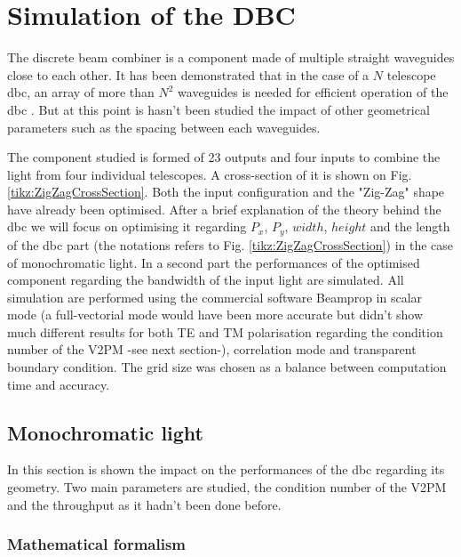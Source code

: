 \documentclass[a4paper,twoside,11pt]{article}
\begin{document}
\section{Simulation of the DBC}
    
    The discrete beam combiner is a component made of multiple straight waveguides close to each other. It has been demonstrated that in the case of a $N$ telescope \gls{dbc}, an array of more than $N^2$ waveguides is needed for efficient operation of the \gls{dbc} \cite{minardi1}. But at this point is hasn't been studied the impact of other geometrical parameters such as the spacing between each waveguides. 
    
    The component studied is formed of 23 outputs and four inputs to combine the light from four individual telescopes. A cross-section of it is shown on Fig. \ref{tikz:ZigZagCrossSection}. Both the input configuration and the "Zig-Zag" shape have already been optimised. After a brief explanation of the theory behind the \gls{dbc} we will focus on optimising it regarding $P_x$, $P_y$, $width$, $height$ and the length of the \gls{dbc} part (the notations refers to Fig. \ref{tikz:ZigZagCrossSection}) in the case of monochromatic light. In a second part the performances of the optimised component regarding the bandwidth of the input light are simulated. All simulation are performed using the commercial software Beamprop\textcompwordmark{} in scalar mode (a full-vectorial mode would have been more accurate but didn't show much different results for both TE and TM polarisation regarding the condition number of the \gls{V2PM} -see next section-), correlation mode and transparent boundary condition. The grid size was chosen as a balance between computation time and accuracy.
    

    \subsection{Monochromatic light}

    In this section is shown the impact on the performances of the \gls{dbc} regarding its geometry. Two main parameters are studied, the condition number of the \gls{V2PM} and the throughput as it hadn't been done before. 
        \subsubsection{Mathematical formalism}\label{sec:mathmono}
        
        
\end{document}
